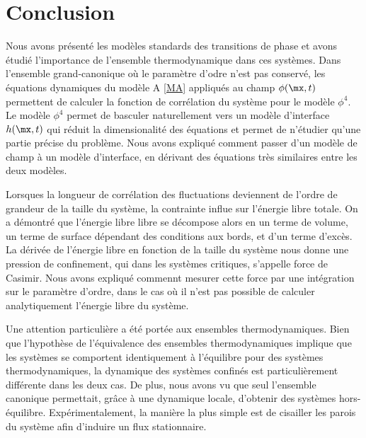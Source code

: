 \section{Conclusion}

Nous avons présenté les modèles standards des transitions de phase et avons étudié l'importance de l'ensemble thermodynamique dans ces systèmes. Dans l'ensemble grand-canonique où le paramètre d'odre n'est pas conservé, les équations dynamiques du modèle A \ref{MA} appliqués au champ $\phi(\mx,t)$ permettent de calculer la fonction de corrélation du système pour le modèle $\phi^4$. Le modèle $\phi^4$ permet de basculer naturellement vers un modèle d'interface $h(\mx,t)$ qui réduit la dimensionalité des équations et permet de n'étudier qu'une partie précise du problème. Nous avons expliqué comment passer d'un modèle de champ à un modèle d'interface, en dérivant des équations très similaires entre les deux modèles.

Lorsques la longueur de corrélation des fluctuations deviennent de l'ordre de grandeur de la taille du système, la contrainte influe sur l'énergie libre totale. On a démontré que l'énergie libre libre se décompose alors en un terme de volume, un terme de surface dépendant des conditions aux bords, et d'un terme d'excès. La dérivée de l'énergie libre en fonction de la taille du système nous donne une pression de confinement, qui dans les systèmes critiques, s'appelle force de Casimir. Nous avons expliqué commennt mesurer cette force par une intégration sur le paramètre d'ordre, dans le cas où il n'est pas possible de calculer analytiquement l'énergie libre du système.

Une attention particulière a été portée aux ensembles thermodynamiques. Bien que l'hypothèse de l'équivalence des ensembles thermodynamiques implique que les systèmes se comportent identiquement à l'équilibre pour des systèmes thermodynamiques, la dynamique des systèmes confinés est particulièrement différente dans les deux cas. De plus, nous avons vu que seul l'ensemble canonique permettait, grâce à une dynamique locale, d'obtenir des systèmes hors-équilibre. Expérimentalement, la manière la plus simple est de cisailler les parois du système afin d'induire un flux stationnaire. 